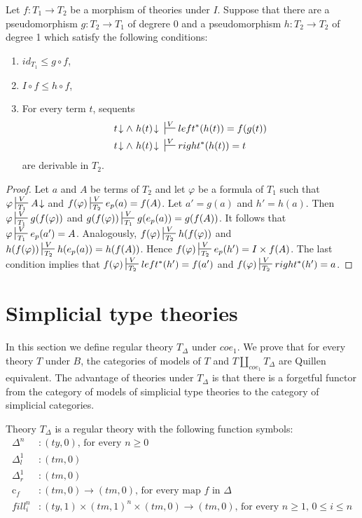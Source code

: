 \documentclass[reqno]{amsart}
\theoremstyle{definition}
\theoremstyle{remark}
\newcommand{\cmap}[1]{\mathrm{c}_{#1}}
\numberwithin{figure}{section}
\begin{document}
\begin{lem}
Let $f : T_1 \to T_2$ be a morphism of theories under $I$.
Suppose that there are a pseudomorphism $g : T_2 \to T_1$ of degrere 0 and a pseudomorphism $h : T_2 \to T_2$ of degree 1 which satisfy the following conditions:
\begin{enumerate}
\item $id_{T_1} \leq g \circ f$,
\item $I \circ f \leq h \circ f$,
\item For every term $t$, sequents
\begin{align*}
t\!\downarrow \land\ h(t)\!\downarrow\ & \sststile{}{V} left^*(h(t)) = f(g(t)) \\
t\!\downarrow \land\ h(t)\!\downarrow\ & \sststile{}{V} right^*(h(t)) = t
\end{align*}
are derivable in $T_2$.
\end{enumerate}
\end{lem}
\begin{proof}
Let $a$ and $A$ be terms of $T_2$ and let $\varphi$ be a formula of $T_1$ such that $\varphi \sststile{T_1}{V} A\!\downarrow$ and $f(\varphi) \sststile{T_2}{V} e_p(a) = f(A)$.
Let $a' = g(a)$ and $h' = h(a)$.
Then $\varphi \sststile{T_1}{V} g(f(\varphi))$ and $g(f(\varphi)) \sststile{T_1}{V} g(e_p(a)) = g(f(A))$.
It follows that $\varphi \sststile{T_1}{V} e_p(a') = A$.
Analogously, $f(\varphi) \sststile{T_2}{V} h(f(\varphi))$ and $h(f(\varphi)) \sststile{T_2}{V} h(e_p(a)) = h(f(A))$.
Hence $f(\varphi) \sststile{T_2}{V} e_p(h') = I \times f(A)$.
The last condition implies that $f(\varphi) \sststile{T_2}{V} left^*(h') = f(a')$ and $f(\varphi) \sststile{T_2}{V} right^*(h') = a$.
\end{proof}

\section{Simplicial type theories}

In this section we define regular theory $T_\Delta$ under $coe_1$.
We prove that for every theory $T$ under $B$, the categories of models of $T$ and $T \amalg_{coe_1} T_\Delta$ are Quillen equivalent.
The advantage of theories under $T_\Delta$ is that there is a forgetful functor from the category of models of simplicial type theories to the category of simplicial categories.

Theory $T_\Delta$ is a regular theory with the following function symbols:
\begin{align*}
\Delta^n & : (ty,0) \text{, for every } n \geq 0 \\
\Delta^1_l & : (tm,0) \\
\Delta^1_r & : (tm,0) \\
\cmap{f} & : (tm,0) \to (tm,0) \text{, for every map $f$ in $\Delta$} \\
fill^n_i & : (ty,1) \times (tm,1)^n \times (tm,0) \to (tm,0) \text{, for every } n \geq 1 \text{, } 0 \leq i \leq n
\end{align*}
\end{document}
